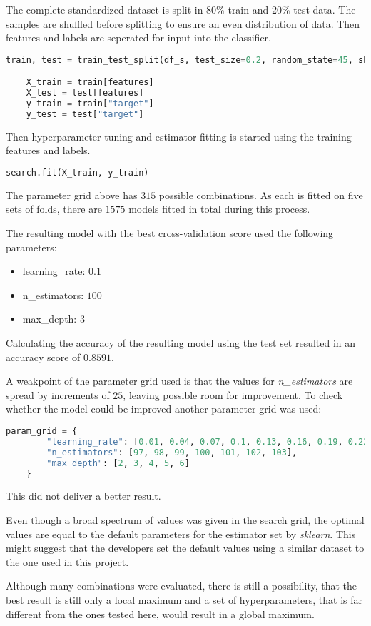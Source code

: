 The complete standardized dataset is split in $80$\% train and $20$\% test data.
The samples are shuffled before splitting to ensure an even distribution of data.
Then features and labels are seperated for input into the classifier.

\begin{lstlisting}[language=Python]
    train, test = train_test_split(df_s, test_size=0.2, random_state=45, shuffle=True)

    X_train = train[features]
    X_test = test[features]
    y_train = train["target"]
    y_test = test["target"]
\end{lstlisting}

Then hyperparameter tuning and estimator fitting is started using the training features and labels.

\begin{lstlisting}[language=Python]
    search.fit(X_train, y_train)
\end{lstlisting}

The parameter grid above has $315$ possible combinations. As each is fitted on five sets of folds,
there are $1575$ models fitted in total during this process.

The resulting model with the best cross-validation score used the following parameters:
\begin{itemize}
    \item learning\_rate: $0.1$
    \item n\_estimators: $100$
    \item max\_depth: $3$
\end{itemize} 

Calculating the accuracy of the resulting model using the test set resulted in an accuracy score of $0.8591$.

A weakpoint of the parameter grid used is that the values for \emph{n\_estimators} are spread by increments of $25$,
leaving possible room for improvement.
To check whether the model could be improved another parameter grid was used:

\begin{lstlisting}[language=Python]
    param_grid = {
        "learning_rate": [0.01, 0.04, 0.07, 0.1, 0.13, 0.16, 0.19, 0.22, 0.25],
        "n_estimators": [97, 98, 99, 100, 101, 102, 103],
        "max_depth": [2, 3, 4, 5, 6]
    }
\end{lstlisting}

This did not deliver a better result.

Even though a broad spectrum of values was given in the search grid, the optimal values 
are equal to the default parameters for the estimator set by \emph{sklearn}.
This might suggest that the developers set the default values using a similar dataset to the one used in this project.

Although many combinations were evaluated, there is still a possibility, that the best result is still only a local 
maximum and a set of hyperparameters, that is far different from the ones tested here, would result in a global maximum. 